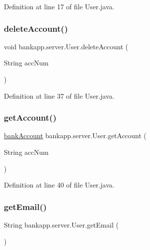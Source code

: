 Definition at line 17 of file User.\+java.

\mbox{\label{classbankapp_1_1server_1_1_user_a90f12d3eae9a484d0f6acc6e74f4a27d}} 
\subsubsection{\texorpdfstring{delete\+Account()}{deleteAccount()}}
{\footnotesize\ttfamily void bankapp.\+server.\+User.\+delete\+Account (\begin{DoxyParamCaption}\item[{String}]{acc\+Num }\end{DoxyParamCaption})}



Definition at line 37 of file User.\+java.

\mbox{\label{classbankapp_1_1server_1_1_user_a88c5fb41ca03f1b131322ef486fb677d}} 
\subsubsection{\texorpdfstring{get\+Account()}{getAccount()}}
{\footnotesize\ttfamily \hyperlink{classbankapp_1_1server_1_1bank_account}{bank\+Account} bankapp.\+server.\+User.\+get\+Account (\begin{DoxyParamCaption}\item[{String}]{acc\+Num }\end{DoxyParamCaption})}



Definition at line 40 of file User.\+java.

\mbox{\label{classbankapp_1_1server_1_1_user_a597376bdfa749415e75185e764b3e04f}} 
\subsubsection{\texorpdfstring{get\+Email()}{getEmail()}}
{\footnotesize\ttfamily String bankapp.\+server.\+User.\+get\+Email (\begin{DoxyParamCaption}{ }\end{DoxyParamCaption})}



